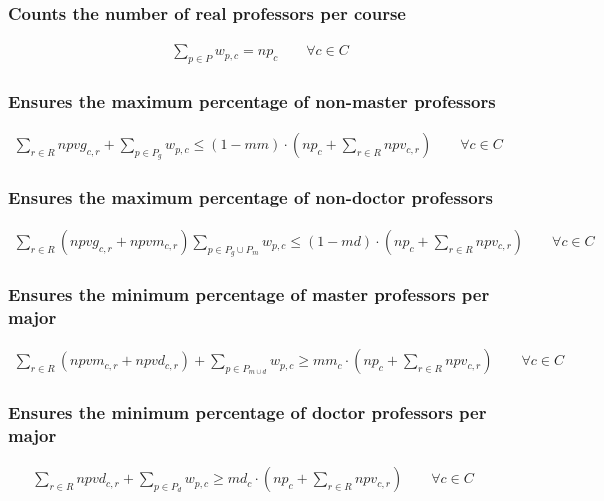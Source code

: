 \subsubsection{Counts the number of real professors per course}
\begin{eqnarray}
\sum\limits_{p \in P} w_{p,c} = np_{c} \nonumber \qquad 
\forall c \in C
\end{eqnarray}

\subsubsection{Ensures the maximum percentage of non-master professors}
\begin{eqnarray}
\sum\limits_{r \in R} npvg_{c,r} + \sum\limits_{p \in P_{g}} w_{p,c} \le (1-mm) \cdot (np_{c} + \sum\limits_{r \in R} npv_{c,r}) \nonumber \qquad 
\forall c \in C \quad
\end{eqnarray}

\subsubsection{Ensures the maximum percentage of non-doctor professors}
\begin{eqnarray}
\sum\limits_{r \in R}( npvg_{c,r} + npvm_{c,r} ) \sum\limits_{p \in P_{g} \cup P_{m} } w_{p,c} \le (1-md) \cdot (np_{c} + \sum\limits_{r \in R} npv_{c,r}) \nonumber \qquad 
\forall c \in C \quad
\end{eqnarray}

\subsubsection{Ensures the minimum percentage of master professors per major}
\begin{eqnarray}
\sum\limits_{r \in R} (npvm_{c,r} + npvd_{c,r}) + \sum\limits_{p \in P_{m \cup d}} w_{p,c} \ge mm_{c} \cdot (np_{c} + \sum\limits_{r \in R} npv_{c,r}) \nonumber \qquad 
\forall c \in C \quad
\end{eqnarray}

\subsubsection{Ensures the minimum percentage of doctor professors per major}
\begin{eqnarray}
\sum\limits_{r \in R} npvd_{c,r} + \sum\limits_{p \in P_{d}} w_{p,c} \ge md_{c} \cdot (np_{c} + \sum\limits_{r \in R} npv_{c,r}) \nonumber \qquad 
\forall c \in C \quad
\end{eqnarray}

